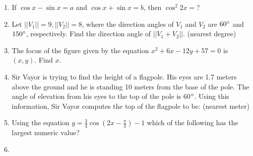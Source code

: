 \documentclass[../uilmath.tex]{subfiles}
\begin{document}
\begin{enumerate}[label=\bfseries\arabic*.]
    \item %
    If $\cos x - \sin x = a$ and $\cos x + \sin x = b$, then $\cos^2 2x=$?

    \item %
    Let $||V_1||=9, ||V_2||=8$, where the direction angles of $V_1$ and $V_2$ are $60\degree$ and $150\degree$, respectively.
    Find the direction angle of $||V_1+V_2||$. (nearest degree)

    \item %
    The focus of the figure given by the equation $x^2+6x-12y+57=0$ is $(x,y)$. Find $x$.

    \item %
    Sir Vayor is trying to find the height of a flagpole. His eyes are 1.7 meters above the ground and he is standing 10 meters from the 
    base of the pole. The angle of elevation from his eyes to the top of the pole is 60$\degree$. Using this information, Sir Vayor computes the top of the flagpole to be: (nearest meter)

    \item %
    Using the equation $y=\frac{3}{4}\cos(2x-\frac{\pi}{3})-1$ which of the following has the largest numeric value?

    \item %
    

\end{enumerate}
\end{document}
